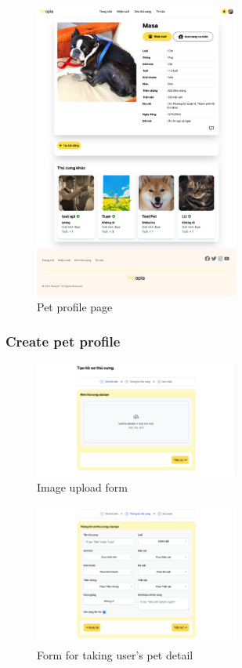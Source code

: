 \begin{figure}[H]
    \centering
    \includegraphics[width=0.6\textwidth]{Figures/UI/pet_detail_ui.png}
    \caption{Pet profile page}
\end{figure}

\subsubsection{Create pet profile}

\begin{figure}[H]
    \centering
    \includegraphics[width=0.6\textwidth]{Figures/UI/image_upload_ui.png}
    \caption{Image upload form}
\end{figure}

\begin{figure}[H]
    \centering
    \includegraphics[width=0.6\textwidth]{Figures/UI/pet_input_ui.png}
    \caption{Form for taking user's pet detail}
\end{figure}

